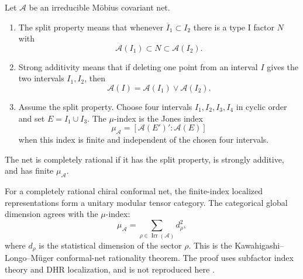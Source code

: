 \begin{definition}
\label{def:complete-rational-conformal-net}
Let \(\mathcal A\) be an irreducible M\"obius covariant net.
\begin{enumerate}
\item The split property means that whenever
  \(\overline I_1\subset I_2\) there is a type I factor \(N\) with
  \[
    \mathcal A(I_1)\subset N\subset\mathcal A(I_2).
  \]
\item Strong additivity means that if deleting one point from an interval
  \(I\) gives the two intervals \(I_1,I_2\), then
  \[
    \mathcal A(I)=\mathcal A(I_1)\vee\mathcal A(I_2).
  \]
\item Assume the split property.  Choose four intervals
  \(I_1,I_2,I_3,I_4\) in cyclic order and set \(E=I_1\cup I_3\).  The
  \(\mu\)-index is the Jones index
  \[
    \mu_{\mathcal A}=[\mathcal A(E')':\mathcal A(E)]
  \]
  when this index is finite and independent of the chosen four intervals.
\end{enumerate}
The net is completely rational if it has the split property, is strongly
additive, and has finite \(\mu_{\mathcal A}\).
\end{definition}

\begin{quotedtheorem}
\label{qthm:complete-rational-net-mtc}
For a completely rational chiral conformal net, the finite-index localized
representations form a unitary modular tensor category.  The categorical
global dimension agrees with the \(\mu\)-index:
\[
  \mu_{\mathcal A}=\sum_{\rho\in\operatorname{Irr}(\mathcal A)} d_\rho^2,
\]
where \(d_\rho\) is the statistical dimension of the sector \(\rho\).
This is the Kawahigashi--Longo--M\"uger conformal-net rationality theorem.
The proof uses subfactor index theory and DHR localization, and is not
reproduced here \cite{KawahigashiLongoMuger2001}.
\end{quotedtheorem}


